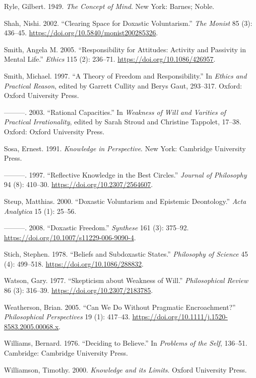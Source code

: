 \documentclass[
  11pt,
  letterpaper,
  DIV=11,
  numbers=noendperiod,
  oneside]{scrartcl}
\newlength{\cslhangindent}
\newenvironment{CSLReferences}[2] %
 {\begin{list}{}{%
  \setlength{\itemindent}{0pt}
  \setlength{\leftmargin}{0pt}
  \setlength{\parsep}{0pt}
  \ifodd #1
   \setlength{\leftmargin}{\cslhangindent}
   \setlength{\itemindent}{-1\cslhangindent}
  \fi
  \setlength{\itemsep}{#2\baselineskip}}}
 {\end{list}}
\begin{document}
\begin{CSLReferences}{1}{0}
Ryle, Gilbert. 1949. \emph{The Concept of Mind}. New York: Barnes;
Noble.

Shah, Nishi. 2002. {``Clearing Space for Doxastic Voluntarism.''}
\emph{The Monist} 85 (3): 436--45.
\url{https://doi.org/10.5840/monist200285326}.

Smith, Angela M. 2005. {``Responsibility for Attitudes: Activity and
Passivity in Mental Life.''} \emph{Ethics} 115 (2): 236--71.
\url{https://doi.org/10.1086/426957}.

Smith, Michael. 1997. {``A Theory of Freedom and Responsibility.''} In
\emph{Ethics and Practical Reason}, edited by Garrett Cullity and Berys
Gaut, 293--317. Oxford: Oxford University Press.

---------. 2003. {``Rational Capacities.''} In \emph{Weakness of Will
and Varities of Practical Irrationality}, edited by Sarah Stroud and
Christine Tappolet, 17--38. Oxford: Oxford University Press.

Sosa, Ernest. 1991. \emph{Knowledge in Perspective}. New York: Cambridge
University Press.

---------. 1997. {``Reflective Knowledge in the Best Circles.''}
\emph{Journal of Philosophy} 94 (8): 410--30.
\url{https://doi.org/10.2307/2564607}.

Steup, Matthias. 2000. {``Doxastic Voluntarism and Epistemic
Deontology.''} \emph{Acta Analytica} 15 (1): 25--56.

---------. 2008. {``Doxastic Freedom.''} \emph{Synthese} 161 (3):
375--92. \url{https://doi.org/10.1007/s11229-006-9090-4}.

Stich, Stephen. 1978. {``Beliefs and Subdoxastic States.''}
\emph{Philosophy of Science} 45 (4): 499--518.
\url{https://doi.org/10.1086/288832}.

Watson, Gary. 1977. {``Skepticism about Weakness of Will.''}
\emph{Philosophical Review} 86 (3): 316--39.
\url{https://doi.org/10.2307/2183785}.

Weatherson, Brian. 2005. {``{Can We Do Without Pragmatic
Encroachment?}''} \emph{Philosophical Perspectives} 19 (1): 417--43.
\url{https://doi.org/10.1111/j.1520-8583.2005.00068.x}.

Williams, Bernard. 1976. {``Deciding to Believe.''} In \emph{Problems of
the Self}, 136--51. Cambridge: Cambridge University Press.

Williamson, Timothy. 2000. \emph{{Knowledge and its Limits}}. Oxford
University Press.

\end{CSLReferences}
\end{document}
